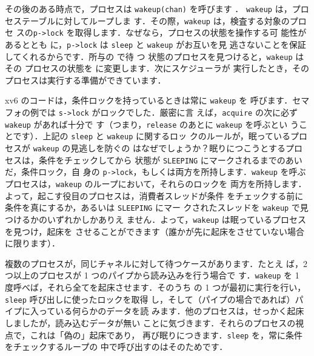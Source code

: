 

その後のある時点で，プロセスは
\lstinline{wakeup(chan)} を呼びます
．
% 
\lstinline{wakeup} は，プロセステーブルに対してループしま
す．その際，\lstinline{wakeup} は，検査する対象のプロセ
スの\lstinline{p->lock} を取得します．なぜなら，プロセスの状態を操作する可
能性があるととも
に，\lstinline{p->lock} は \lstinline{sleep} と \lstinline{wakeup} がお互いを見
逃さないことを保証してくれるからです．所与の  で待
つ  状態のプロセスを見つけると，\lstinline{wakeup} はその
プロセスの状態を  に変更します．次にスケジューラが
実行したとき，そのプロセスは実行する準備ができています．

xv6 のコードは，条件ロックを持っているときは常に \lstinline{wakeup} を
呼びます．セマフォの例では \lstinline{s->lock} がロックでした．厳密に言
えば，\lstinline{acquire} の次に必ず \lstinline{wakeup} があれば十分で
す（つまり，\lstinline{release} のあとに \lstinline{wakeup} を呼ぶとい
うことです）．上記の \lstinline{sleep} と \lstinline{wakeup} に関するロッ
クのルールが，眠っているプロセスが \lstinline{wakeup} の見逃しを防ぐの
はなぜでしょうか？眠りにつこうとするプロセスは，条件をチェックしてから
状態が \lstinline{SLEEPING} にマークされるまでのあいだ，条件ロック，自
身の \lstinline{p->lock}，もしくは両方を所持します．\lstinline{wakeup}
を呼ぶプロセスは，\lstinline{wakeup} のループにおいて，それらのロックを
両方を所持します．よって，起こす役目のプロセスは，消費者スレッドが条件
をチェックする前に条件を真にするか，あるいは \lstinline{SLEEPING} にマー
クされたスレッドを \lstinline{wakeup} で見つけるかのいずれかしかありえ
ません．よって，\lstinline{wakeup} は眠っているプロセスを見つけ，起床を
させることができます（誰かが先に起床をさせていない場合に限ります）．

複数のプロセスが，同じチャネルに対して待つケースがあります．たとえ
ば，2つ以上のプロセスが 1 つのパイプから読み込みを行う場合で
す．\lstinline{wakeup} を 1 度呼べば，それら全てを起床させます．そのうち
の 1 つが最初に実行を行い，\lstinline{sleep} 呼び出しに使ったロックを取得
し，そして（パイプの場合であれば）パイプに入っている何らかのデータを読
みます．他のプロセスは，せっかく起床しましたが，読み込むデータが無い
ことに気づきます．それらのプロセスの視点で，これは「偽の」起床であり，
再び眠りにつきます．\lstinline{sleep} を，常に条件をチェックするループの
中で呼び出すのはそのためです．

